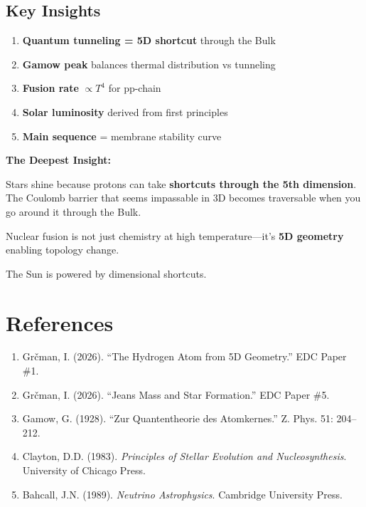 \documentclass[12pt,a4paper]{article}
\begin{document}
\subsection{Key Insights}

\begin{enumerate}
    \item \textbf{Quantum tunneling = 5D shortcut} through the Bulk
    \item \textbf{Gamow peak} balances thermal distribution vs tunneling
    \item \textbf{Fusion rate} $\propto T^4$ for pp-chain
    \item \textbf{Solar luminosity} derived from first principles
    \item \textbf{Main sequence} = membrane stability curve
\end{enumerate}

\begin{insight}
\textbf{The Deepest Insight:}

Stars shine because protons can take \textbf{shortcuts through the 5th dimension}. The Coulomb barrier that seems impassable in 3D becomes traversable when you go around it through the Bulk.

Nuclear fusion is not just chemistry at high temperature---it's \textbf{5D geometry} enabling topology change.

The Sun is powered by dimensional shortcuts.
\end{insight}

\section*{References}

\begin{enumerate}
    \item Gr\v{c}man, I. (2026). ``The Hydrogen Atom from 5D Geometry.'' EDC Paper \#1.
    
    \item Gr\v{c}man, I. (2026). ``Jeans Mass and Star Formation.'' EDC Paper \#5.
    
    \item Gamow, G. (1928). ``Zur Quantentheorie des Atomkernes.'' Z. Phys. 51: 204--212.
    
    \item Clayton, D.D. (1983). \textit{Principles of Stellar Evolution and Nucleosynthesis}. University of Chicago Press.
    
    \item Bahcall, J.N. (1989). \textit{Neutrino Astrophysics}. Cambridge University Press.
\end{enumerate}
\end{document}
